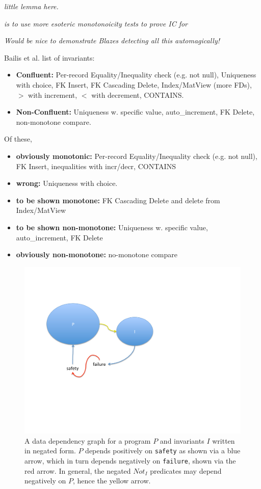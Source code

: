 \documentclass{sig-alternate}
\begin{document}
\emph{little lemma here.}

\emph{ is to use more esoteric monotonoicity tests to prove IC for }

\emph{Would be nice to demonstrate Blazes detecting all this automagically!}

Bailis et al. list of invariants:
\begin{itemize}
\item {\bf Confluent:} Per-record Equality/Inequality check (e.g. not null), Uniqueness with choice, FK Insert, FK Cascading Delete, Index/MatView (more FDs), $>$ with increment, $<$ with decrement, CONTAINS.
\item {\bf Non-Confluent:} Uniqueness w. specific value, auto\_increment, FK Delete, non-monotone compare.
\end{itemize}

Of these, 
\begin{itemize}
\item {\bf obviously monotonic:} Per-record Equality/Inequality check (e.g. not null), FK Insert, inequalities with incr/decr, CONTAINS
\item {\bf wrong:} Uniqueness with choice.
\item {\bf to be shown monotone:} FK Cascading Delete and delete from Index/MatView
\item {\bf to be shown non-monotone:} Uniqueness w. specific value, auto\_increment, FK Delete
\item {\bf obviously non-monotone:} no-monotone compare
\end{itemize}

\begin{figure}[t]
\centering
\includegraphics[width=0.9\linewidth]{invariant-rewrite.pdf}
\vspace{-10pt}
\caption{A data dependency graph for a program $P$ and invariants $I$ written in negated form.  $P$ depends positively on \texttt{safety} as shown via a blue arrow, which in turn depends negatively on \texttt{failure}, shown via the red arrow.  In general, the negated $Not_I$ predicates may depend negatively on $P$, hence the yellow arrow.}
\label{fig:invariant-rewrite}
\vspace{-2pt}
\end{figure}
\end{document}
